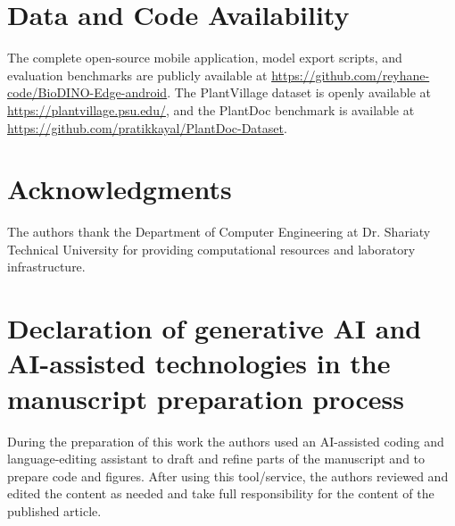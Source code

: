 \documentclass[preprint,12pt]{elsarticle}
\begin{document}
\section*{Data and Code Availability}
The complete open-source mobile application, model export scripts, and evaluation benchmarks are publicly available at \url{https://github.com/reyhane-code/BioDINO-Edge-android}. The PlantVillage dataset is openly available at \url{https://plantvillage.psu.edu/}, and the PlantDoc benchmark is available at \url{https://github.com/pratikkayal/PlantDoc-Dataset}.

\section*{Acknowledgments}
The authors thank the Department of Computer Engineering at Dr. Shariaty Technical University for providing computational resources and laboratory infrastructure.

\section*{Declaration of generative AI and AI-assisted technologies in the manuscript preparation process}
During the preparation of this work the authors used an AI-assisted coding and language-editing assistant to draft and refine parts of the manuscript and to prepare code and figures. After using this tool/service, the authors reviewed and edited the content as needed and take full responsibility for the content of the published article.



\end{document}
